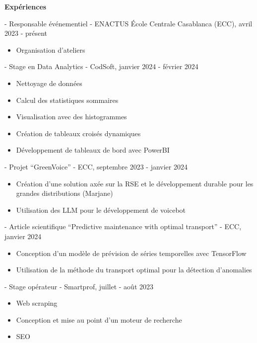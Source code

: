 \documentclass[11pt]{article}
\newcommand{\subsectiontitle}[1]{\noindent\textbf{#1}}
\begin{document}
\begin{multicols}{2}

\subsectiontitle{Expériences}

- Responsable événementiel - ENACTUS École Centrale Casablanca (ECC), avril 2023 - présent
    \begin{itemize}[itemsep=0pt, topsep=0pt, partopsep=0pt]
        \item Organisation d'ateliers
    \end{itemize}

- Stage en Data Analytics - CodSoft, janvier 2024 - février 2024
    \begin{itemize}[itemsep=0pt, topsep=0pt, partopsep=0pt]
        \item Nettoyage de données
        \item Calcul des statistiques sommaires
        \item Visualisation avec des histogrammes
        \item Création de tableaux croisés dynamiques
        \item Développement de tableaux de bord avec PowerBI
    \end{itemize}

- Projet “GreenVoice” - ECC, septembre 2023 - janvier 2024
    \begin{itemize}[itemsep=0pt, topsep=0pt, partopsep=0pt]
        \item Création d'une solution axée sur la RSE et le développement durable pour les grandes distributions (Marjane)
        \item Utilisation des LLM pour le développement de voicebot
    \end{itemize}

- Article scientifique “Predictive maintenance with optimal transport” - ECC, janvier 2024
    \begin{itemize}[itemsep=0pt, topsep=0pt, partopsep=0pt]
        \item Conception d'un modèle de prévision de séries temporelles avec TensorFlow
        \item Utilisation de la méthode du transport optimal pour la détection d'anomalies
    \end{itemize}

- Stage opérateur - Smartprof, juillet - août 2023
    \begin{itemize}[itemsep=0pt, topsep=0pt, partopsep=0pt]
        \item Web scraping
        \item Conception et mise au point d'un moteur de recherche
        \item SEO
    \end{itemize}


\end{multicols}
\end{document}
